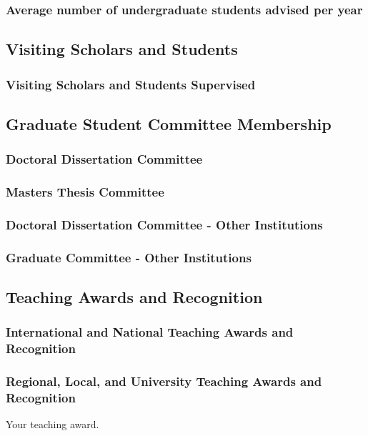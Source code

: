 \subsubsection{Average number of undergraduate students advised per year}

\subsection{Visiting Scholars and Students}
\subsubsection{Visiting Scholars and Students Supervised}

\subsection{Graduate Student Committee Membership}
\subsubsection{Doctoral Dissertation Committee}

\subsubsection{Masters Thesis Committee}

\subsubsection{Doctoral Dissertation Committee - Other Institutions}
\subsubsection{Graduate Committee - Other Institutions}


\subsection{Teaching Awards and Recognition}
\subsubsection{International and National Teaching Awards and Recognition}
\subsubsection{Regional, Local, and University Teaching Awards and Recognition}
\begin{myenum}
  \item Your teaching award.
\end{myenum}


